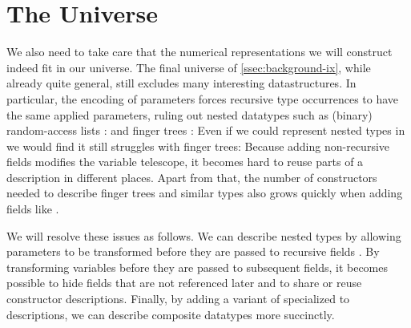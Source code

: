\section{The Universe}\label{ssec:desc}
We also need to take care that the numerical representations we will construct indeed fit in our universe. The final universe  of \autoref{ssec:background-ix}, while already quite general, still excludes many interesting datastructures. In particular, the encoding of parameters forces recursive type occurrences to have the same applied parameters, ruling out nested datatypes such as (binary) random-access lists \cite{calcdata,purelyfunctional}:
and finger trees \cite{fingertrees}:
Even if we could represent nested types in  we would find it still struggles with finger trees: Because adding non-recursive fields modifies the variable telescope, it becomes hard to reuse parts of a description in different places. Apart from that, the number of constructors needed to describe finger trees and similar types also grows quickly when adding fields like .

We will resolve these issues as follows. We can describe nested types by allowing parameters to be transformed before they are passed to recursive fields \cite{initenough}. By transforming variables before they are passed to subsequent fields, it becomes possible to hide fields that are not referenced later and to share or reuse constructor descriptions. Finally, by adding a variant of  specialized to descriptions, we can describe composite datatypes more succinctly.

